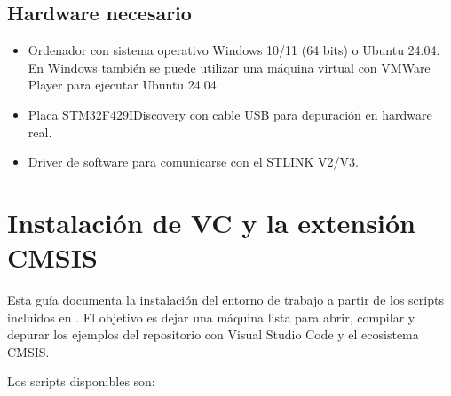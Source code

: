 \documentclass[letterpaper,10pt,english]{sphinxmanual}
\begin{document}
\section{Hardware necesario}
\label{\detokenize{requisitos:hardware-necesario}}\begin{itemize}
\item {} 
\sphinxAtStartPar
Ordenador con sistema operativo Windows 10/11 (64 bits) o Ubuntu 24.04. En Windows también se puede utilizar una máquina virtual con VMWare Player para ejecutar Ubuntu 24.04\sphinxhyphen{}

\item {} 
\sphinxAtStartPar
Placa STM32F429I\sphinxhyphen{}Discovery con cable USB para depuración en hardware real.

\item {} 
\sphinxAtStartPar
Driver de software para comunicarse con el ST\sphinxhyphen{}LINK V2/V3.

\end{itemize}

\sphinxstepscope


\chapter{Instalación de VC y la extensión CMSIS}
\label{\detokenize{vscode:instalacion-de-vc-y-la-extension-cmsis}}\label{\detokenize{vscode:vscode}}\label{\detokenize{vscode::doc}}
\sphinxAtStartPar
Esta guía documenta la instalación del entorno de trabajo a partir de los
scripts incluidos en . El objetivo es dejar una máquina lista para abrir, compilar y depurar los
ejemplos del repositorio con Visual Studio Code y el ecosistema CMSIS.

\sphinxAtStartPar
Los scripts disponibles son:
\end{document}
